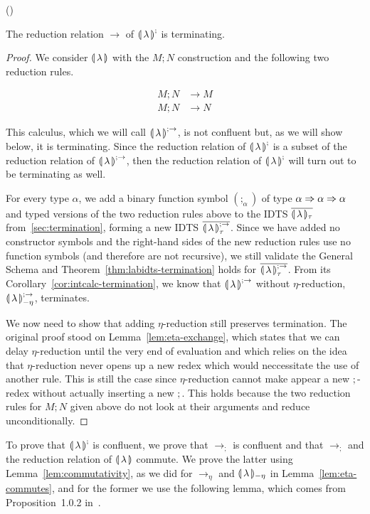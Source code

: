 \begin{lemma}\label{lem:semibanana-termination}
  ()

  The reduction relation $\to$ of ${\llparenthesis \, \lambda \, \rrparenthesis}^;$ is terminating.
\end{lemma}

\begin{proof}
  We consider ${\llparenthesis \, \lambda \, \rrparenthesis}$ with the $M; N$ construction and the following two
  reduction rules.

  \begin{align*}
    M; N &\to M \\
    M; N &\to N
  \end{align*}

  This calculus, which we will call ${\llparenthesis \, \lambda \, \rrparenthesis}^{;\to}$, is not confluent but,
  as we will show below, it is terminating. Since the reduction relation of
  ${\llparenthesis \, \lambda \, \rrparenthesis}^;$ is a subset of the reduction relation of ${\llparenthesis \, \lambda \, \rrparenthesis}^{;\to}$, then
  the reduction relation of ${\llparenthesis \, \lambda \, \rrparenthesis}^;$ will turn out to be terminating as
  well.

  For every type $\alpha$, we add a binary function symbol $(;_\alpha)$ of
  type $\alpha \Rightarrow \alpha \Rightarrow \alpha$ and typed versions of the two
  reduction rules above to the IDTS ${\overline{\llparenthesis \, \lambda \, \rrparenthesis_\tau}}$ from~\ref{sec:termination},
  forming a new IDTS $\overline{{\llparenthesis \, \lambda \, \rrparenthesis}^{;\to}_\tau}$. Since we have added no
  constructor symbols and the right-hand sides of the new reduction rules
  use no function symbols (and therefore are not recursive), we still
  validate the General Schema and Theorem~\ref{thm:labidts-termination}
  holds for $\overline{{\llparenthesis \, \lambda \, \rrparenthesis}^{;\to}_\tau}$. From its
  Corollary~\ref{cor:intcalc-termination}, we know that ${\llparenthesis \, \lambda \, \rrparenthesis}^{;\to}$
  without $\eta$-reduction, ${\llparenthesis \, \lambda \, \rrparenthesis}^{;\to}_{-\eta}$, terminates.

  We now need to show that adding $\eta$-reduction still preserves
  termination. The original proof stood on Lemma~\ref{lem:eta-exchange},
  which states that we can delay $\eta$-reduction until the very end of
  evaluation and which relies on the idea that $\eta$-reduction never opens
  up a new redex which would neccessitate the use of another rule. This is
  still the case since $\eta$-reduction cannot make appear a new $;$-redex
  without actually inserting a new $;$. This holds because the two
  reduction rules for $M; N$ given above do not look at their arguments and
  reduce unconditionally.
\end{proof}

To prove that ${\llparenthesis \, \lambda \, \rrparenthesis}^;$ is confluent, we prove that $\to_;$ is confluent
and that $\to_;$ and the reduction relation of ${\llparenthesis \, \lambda \, \rrparenthesis}$ commute. We prove
the latter using Lemma~\ref{lem:commutativity}, as we did for $\to_\eta$
and ${\llparenthesis \, \lambda \, \rrparenthesis_{-\eta}}$ in Lemma~\ref{lem:eta-commutes}, and for the former we use
the following lemma, which comes from Proposition~1.0.2
in~\cite{klop1992term}.

